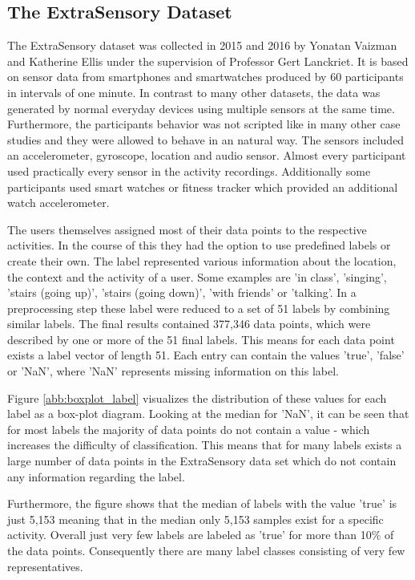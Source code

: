 \subsection{The ExtraSensory Dataset}

The ExtraSensory dataset was collected in 2015 and 2016 by Yonatan Vaizman and Katherine Ellis under the supervision of Professor Gert Lanckriet. It is based on sensor data from smartphones and smartwatches produced by 60 participants in intervals of one minute. In contrast to many other datasets, the data was generated by normal everyday devices using multiple sensors at the same time. Furthermore, the participants behavior was not scripted like in many other case studies and they were allowed to behave in an natural way. The sensors included an accelerometer, gyroscope, location and audio sensor. Almost every participant used practically every sensor in the activity recordings. Additionally some participants used smart watches or fitness tracker which provided an additional watch accelerometer.

The users themselves assigned most of their data points to the respective activities. In the course of this they had the option to use predefined labels or create their own. The label represented various information about the location, the context and the activity of a user. Some examples are 'in class', 'singing', 'stairs (going up)', 'stairs (going down)', 'with friends' or 'talking'. In a preprocessing step these label were reduced to a set of 51 labels by combining similar labels.
The final results contained 377,346 data points, which were described by one or more of the 51 final labels. This means for each data point exists a label vector of length 51. Each entry can contain the values 'true', 'false' or 'NaN', where 'NaN' represents missing information on this label.

Figure \ref{abb:boxplot_label} visualizes the distribution of these values for each label as a box-plot diagram. Looking at the median for 'NaN', it can be seen that for most labels the majority of data points do not contain a value - which increases the difficulty of classification. This means that for many labels exists a large number of data points in the ExtraSensory data set which do not contain any information regarding the label.

Furthermore, the figure shows that the median of labels with the value 'true' is just 5,153 meaning that in the median only 5,153 samples exist for a specific activity. Overall just very few labels are labeled as 'true' for more than 10\% of the data points. Consequently there are many label classes consisting of very few representatives. 

